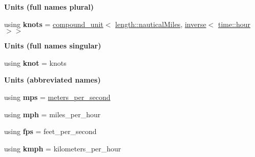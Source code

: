 \begin{Indent}{\bf Units (full names plural)}
\begin{DoxyCompactItemize}
\item 
\hypertarget{namespaceunits_1_1velocity_adb7638668d36bfb49be44b922024b452}{}using {\bfseries knots} = \hyperlink{group___unit_types_ga9c3f6f077dc894620e1ed8358442a8f1}{compound\+\_\+unit}$<$ \hyperlink{structunits_1_1unit}{length\+::nautical\+Miles}, \hyperlink{group___unit_manipulators_gaacc539ef162e24b260d023d3ff949b57}{inverse}$<$ \hyperlink{structunits_1_1unit}{time\+::hour} $>$$>$\label{namespaceunits_1_1velocity_adb7638668d36bfb49be44b922024b452}

\end{DoxyCompactItemize}
\end{Indent}
\begin{Indent}{\bf Units (full names singular)}\par
\begin{DoxyCompactItemize}
\item 
\hypertarget{namespaceunits_1_1velocity_a9f0aa94701c9bb33cab936abe5fe1817}{}using {\bfseries knot} = knots\label{namespaceunits_1_1velocity_a9f0aa94701c9bb33cab936abe5fe1817}

\end{DoxyCompactItemize}
\end{Indent}
\begin{Indent}{\bf Units (abbreviated names)}\par
\begin{DoxyCompactItemize}
\item 
\hypertarget{namespaceunits_1_1velocity_a6c355a61ab821225ccd002bad8bb1a09}{}using {\bfseries mps} = \hyperlink{structunits_1_1unit}{meters\+\_\+per\+\_\+second}\label{namespaceunits_1_1velocity_a6c355a61ab821225ccd002bad8bb1a09}

\item 
\hypertarget{namespaceunits_1_1velocity_aebb0b3ef769ab5b383b0321aa820cc6b}{}using {\bfseries mph} = miles\+\_\+per\+\_\+hour\label{namespaceunits_1_1velocity_aebb0b3ef769ab5b383b0321aa820cc6b}

\item 
\hypertarget{namespaceunits_1_1velocity_a9944e9d7d6731816e44576db0db80f0c}{}using {\bfseries fps} = feet\+\_\+per\+\_\+second\label{namespaceunits_1_1velocity_a9944e9d7d6731816e44576db0db80f0c}

\item 
\hypertarget{namespaceunits_1_1velocity_aa735e390faa339627174fc3a077d0fa7}{}using {\bfseries kmph} = kilometers\+\_\+per\+\_\+hour\label{namespaceunits_1_1velocity_aa735e390faa339627174fc3a077d0fa7}

\end{DoxyCompactItemize}
\end{Indent}
